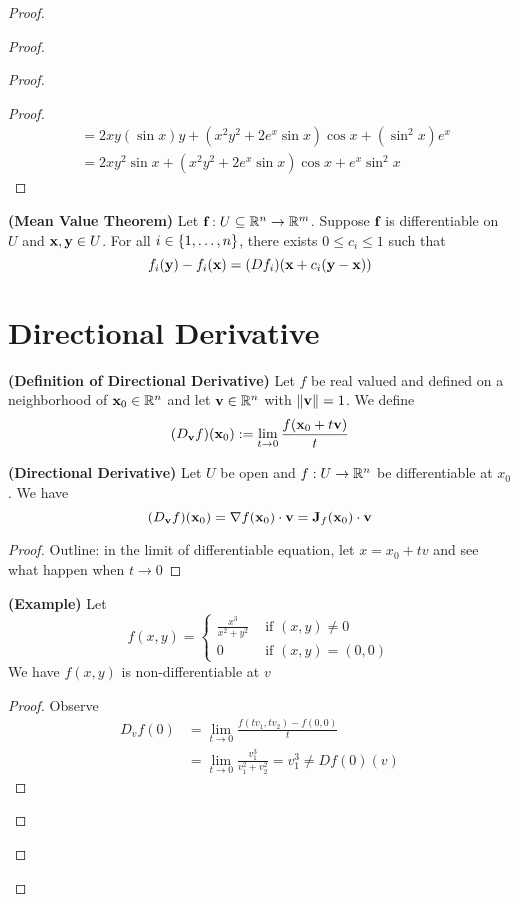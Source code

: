 \documentclass{report}
\begin{document}
\begin{proof}
\begin{proof}
\begin{proof}
\begin{proof}
\begin{align}
  &=2xy(\sin x)y+(x^2y^2+2e^x \sin x)\cos x+(\sin^2 x)e^x\\
  &=2xy^2\sin x+(x^2y^2+2e^x\sin x) \cos x+ e^x\sin^2 x
\end{align}
\end{proof}
\begin{theorem}
\label{6.3.7}
\textbf{(Mean Value Theorem)} Let $\textbf{f}:U\subseteq \mathbb{R}^n\rightarrow \mathbb{R}^m$. Suppose $\textbf{f}$ is differentiable on $U$ and $\textbf{x},\textbf{y}\in U$. For all $i\in \{ 1,\dots , n \}$, there exists $0\leq c_i\leq 1$ such that 
\begin{equation}
f_i(\textbf{y})-f_i(\textbf{x})=(Df_i)(\textbf{x}+c_i(\textbf{y}-\textbf{x}))
\end{equation}
\end{theorem}
\section{Directional Derivative}
\begin{definition}
\label{6.4.1}
  \textbf{(Definition of Directional Derivative)} Let $f$ be real valued and defined on a neighborhood of $\textbf{x}_0 \in\mathbb{R}^n$ and let $\textbf{v}\in\mathbb{R}^n$ with $\| \textbf{v} \|=1$. We define 
  \begin{equation}
    (D_{\textbf{v}}f)(\textbf{x}_0):=\lim_{t\to 0}\frac{f(\textbf{x}_0+t\textbf{v})}{t}
  \end{equation}
\end{definition}
\begin{theorem}
\label{6.4.2}
\textbf{(Directional Derivative)} Let $U$ be open and $f:U\rightarrow \mathbb{R}^n$ be differentiable at $x_0$. We have
 \begin{equation}
   (D_{\textbf{v}}f)(\textbf{x}_0)=\nabla f(\textbf{x}_0)\cdot \textbf{v}=\textbf{J}_f(\textbf{x}_0)\cdot \textbf{v}
\end{equation}
\end{theorem}
\begin{proof}
Outline: in the limit of differentiable equation, let $x=x_0+tv$ and see what happen when  $t \to 0$
\end{proof}
\begin{theorem}
\label{6.4.3}
\textbf{(Example)} Let
\begin{equation}
f(x,y)=\begin{cases}
  \frac{x^3}{x^2+y^2}& \text{ if  }(x,y)\neq 0\\
  0 & \text{ if  }(x,y)=(0,0)
\end{cases}
\end{equation}
We have $f(x,y)$ is non-differentiable at $v$
\end{theorem}
\begin{proof}
Observe
\begin{align}
D_vf(0)&=\lim_{t \to 0}\frac{f(tv_1,tv_2)-f(0,0)}{t}\\
&=\lim_{t\to0}\frac{v_1^3}{v_1^2+v_2^2}=v_1^3\neq Df(0)(v)
\end{align}
\end{proof}

\end{proof}
\end{proof}
\end{proof}
\end{document}
